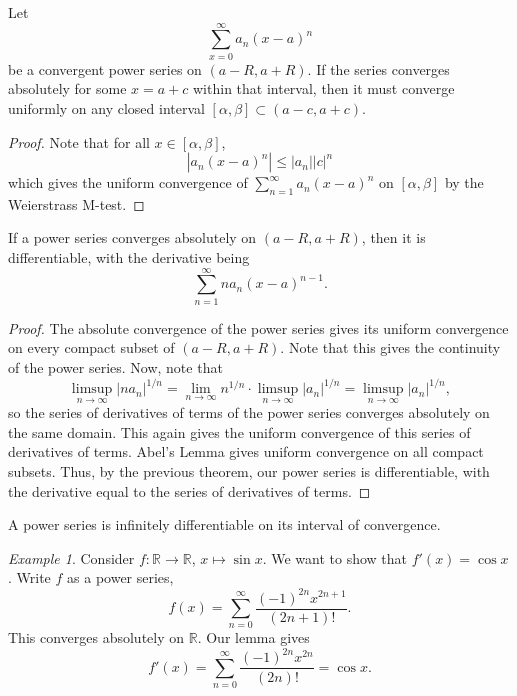 \documentclass[11pt]{article}
\def\R{\mathbb{R}}
\theoremstyle{definition}
\theoremstyle{remark}
\newtheorem*{example}{Example}
\numberwithin{equation}{module}
\begin{document}
    \begin{lemma}
        Let \[
            \sum_{x = 0}^\infty a_n(x - a)^n
        \] be a convergent power series on $(a - R, a + R)$. If the series converges
        absolutely for some $x = a + c$ within that interval, then it must converge
        uniformly on any closed interval $[\alpha, \beta] \subset (a - c, a + c)$.
    \end{lemma}
    \begin{proof}
        Note that for all $x \in [\alpha, \beta]$, \[
            |a_n(x - a)^n| \leq |a_n| |c|^n
        \] which gives the uniform convergence of $\sum_{n = 1}^\infty a_n(x - a)^n$
        on $[\alpha, \beta]$ by the Weierstrass M-test.
    \end{proof}
    \begin{lemma}
        If a power series converges absolutely on $(a - R, a + R)$, then it is
        differentiable, with the derivative being \[
            \sum_{n = 1}^\infty na_n(x - a)^{n - 1}.
        \]
    \end{lemma}
    \begin{proof}
        The absolute convergence of the power series gives its uniform convergence
        on every compact subset of $(a - R, a + R)$. Note that this gives the
        continuity of the power series. Now, note that \[
            \limsup_{n \to \infty} |na_n|^{1 / n} = \lim_{n \to \infty} n^{1
            /n}\cdot \limsup_{n \to \infty} |a_n|^{1 / n} = \limsup_{n \to \infty}
            |a_n|^{1 /n},
        \] so the series of derivatives of terms of the power series converges
        absolutely on the same domain. This again gives the uniform convergence of
        this series of derivatives of terms. Abel's Lemma gives uniform
        convergence on all compact subsets. Thus, by the previous theorem, our power
        series is differentiable, with the derivative equal to the series of
        derivatives of terms.
    \end{proof}
    \begin{corollary}
        A power series is infinitely differentiable on its interval of convergence.
    \end{corollary}
    \begin{example}
        Consider $f\colon \R \to \R$, $x \mapsto \sin{x}$. We want to show that
        $f'(x) = \cos{x}$. Write $f$ as a power series, \[
            f(x) = \sum_{n = 0}^\infty \frac{(-1)^{2n}x^{2n + 1}}{(2n + 1)!}.
        \] This converges absolutely on $\R$. Our lemma gives \[
            f'(x) = \sum_{n = 0}^\infty \frac{(-1)^{2n}x^{2n}}{(2n)!} = \cos{x}.
        \] 
    \end{example}
\end{document}
